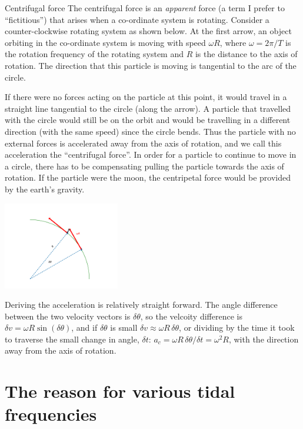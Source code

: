 \clearpage 
\clearpage 

\begin{derivbox}[label={box:centrifugalforce}]{Centrifugal force}
  The centrifugal force is an \emph{apparent} force (a term I prefer to ``fictitious'') that arises when a co-ordinate system is rotating.  Consider a counter-clockwise rotating system as shown below.  At the first arrow, an object orbiting in the co-ordinate system is moving with speed $\omega R$, where $\omega = 2\pi/T$ is the rotation frequency of the rotating system and $R$ is the distance to the axis of rotation.  The direction that this particle is moving is tangential to the arc of the circle.  
  
If there were no forces acting on the particle at this point, it would travel in a straight line tangential to the circle (along the arrow).  A particle that travelled with the circle would still be on the orbit and would be travelling in a different direction (with the same speed) since the circle bends.  Thus the particle with no external forces is accelerated away from the axis of rotation, and we call this acceleration the ``centrifugal force''.  In order for a particle to continue to move in a circle, there has to be compensating  pulling the particle towards the axis of rotation.  If the particle were the moon, the centripetal force would be provided by the earth's gravity. 

  \includegraphics[width=2in]{figs/Waves/CentrifugalForce}
  
Deriving the acceleration  is relatively straight forward.  The angle difference between the two velocity vectors is $\delta \theta$, so the velcoity difference is $\delta v = \omega R \sin(\delta \theta)$, and if $\delta \theta$ is small $\delta v \approx \omega R\, \delta \theta$, or dividing by the time it took to traverse the small change in angle, $\delta t$: $a_c = \omega R \,\delta\theta/\delta t = \omega^2 R$, with the direction away from the axis of rotation.  
\end{derivbox}

\section{The reason for various tidal frequencies}

